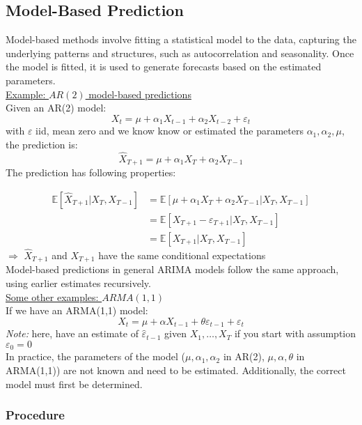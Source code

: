 \subsection{Model-Based Prediction}

Model-based methods involve fitting a statistical model to the data, capturing the underlying patterns and structures, such as autocorrelation and seasonality. Once the model is fitted, it is used to generate forecasts based on the estimated parameters. \\

\underline{Example: $AR(2)$ model-based predictions}\\

Given an AR(2) model: \[X_t=\mu +\alpha_1X_{t-1} + \alpha_2 X_{t-2}+\varepsilon_t\] with $\varepsilon$ iid, mean zero and we know know or estimated the parameters $\alpha_1, \alpha_2, \mu$, the prediction is:\[
\hat{X}_{T+1}=\mu +\alpha_1 X_T + \alpha_2 X_{T-1}
\]
The prediction has following properties: 

    \begin{align*}
        \mathbb{E}[\hat{X}_{T+1} | X_T, X_{T-1}] &= \mathbb{E}[\mu+\alpha_1 X_T+\alpha_2 X_{T-1} |X_T, X_{T-1}]\\
        &=\mathbb{E}[X_{T+1}-\varepsilon_{T+1} | X_T, X_{T-1}]\\
        &=\mathbb{E}[X_{T+1} | X_T, X_{T-1}]
    \end{align*}
$\Rightarrow$ $\hat{X}_{T+1}$ and $X_{T+1}$ have the same conditional expectations \\

Model-based predictions in general ARIMA models follow the same approach, using earlier estimates recursively. \\

\underline{Some other examples: $ARMA(1,1)$} \\

If we have an ARMA(1,1) model: 
\[X_t=\mu + \alpha X_{t-1}+\theta \varepsilon_{t-1}+\varepsilon_t \]
\textit{Note:} here, have an estimate of $\hat{\varepsilon}_{t-1} $ given $X_1,\ldots,X_T$ if you start with assumption $\varepsilon_0=0$ \\

In practice, the parameters of the model ($\mu,\alpha_1,\alpha_2$ in AR(2), $\mu,\alpha,\theta$ in ARMA(1,1)) are not known and need to be estimated. Additionally, the correct model must first be determined. 


\subsubsection{Procedure}


